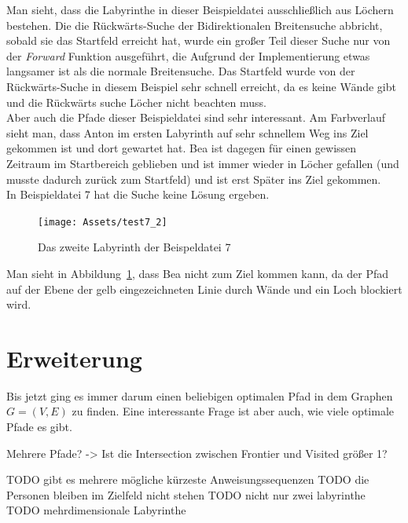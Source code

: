 \documentclass[a4paper,10pt,ngerman]{scrartcl}
\begin{document}
    Man sieht, dass die Labyrinthe in dieser Beispieldatei ausschließlich aus Löchern bestehen.
    Die die Rückwärts-Suche der Bidirektionalen Breitensuche abbricht, sobald sie das Startfeld erreicht hat, wurde ein großer Teil dieser Suche nur von der \textit{Forward} Funktion ausgeführt, die Aufgrund der Implementierung etwas langsamer ist als die normale Breitensuche.
    Das Startfeld wurde von der Rückwärts-Suche in diesem Beispiel sehr schnell erreicht, da es keine Wände gibt und die Rückwärts suche Löcher nicht beachten muss. \\
    Aber auch die Pfade dieser Beispieldatei sind sehr interessant.
    Am Farbverlauf sieht man, dass Anton im ersten Labyrinth auf sehr schnellem Weg ins Ziel gekommen ist und dort gewartet hat.
    Bea ist dagegen für einen gewissen Zeitraum im Startbereich geblieben und ist immer wieder in Löcher gefallen (und musste dadurch zurück zum Startfeld) und ist erst Später ins Ziel gekommen. \\
    In Beispieldatei 7 hat die Suche keine Lösung ergeben.
    \begin{figure}[H]
        \label{fig:7}
        \centering
        \texttt{[image: Assets/test7\_2]}

        \caption{Das zweite Labyrinth der Beispeldatei 7}
    \end{figure}
    Man sieht in Abbildung~\ref{fig:7}, dass Bea nicht zum Ziel kommen kann, da der Pfad auf der Ebene der gelb eingezeichneten Linie durch Wände und ein Loch blockiert wird.


    \section{Erweiterung}
    Bis jetzt ging es immer darum einen beliebigen optimalen Pfad in dem Graphen $G = (V, E)$ zu finden.
    Eine interessante Frage ist aber auch, wie viele optimale Pfade es gibt.

    Mehrere Pfade? -> Ist die Intersection zwischen Frontier und Visited größer 1?


    TODO gibt es mehrere mögliche kürzeste Anweisungssequenzen
    TODO die Personen bleiben im Zielfeld nicht stehen
    TODO nicht nur zwei labyrinthe
    TODO mehrdimensionale Labyrinthe

    \printbibliography
\end{document}
